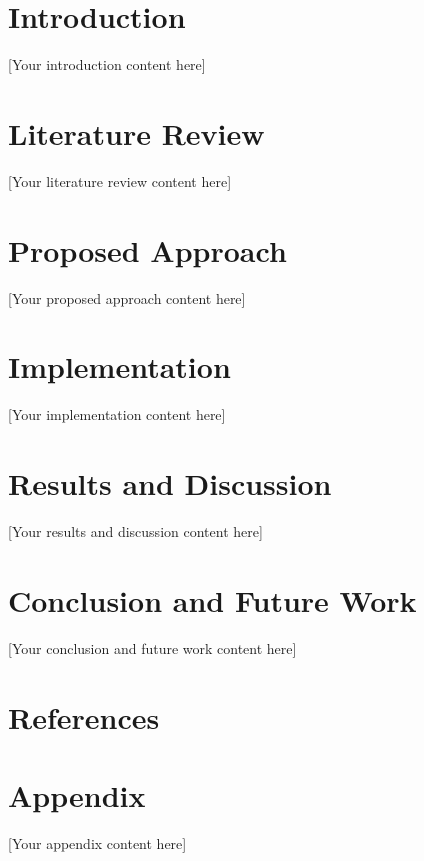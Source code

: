 \documentclass[12pt,a4paper]{report}
\begin{document}
\tableofcontents
\listoffigures
\clearpage

\chapter{Introduction}
[Your introduction content here]

\chapter{Literature Review}
[Your literature review content here]

\chapter{Proposed Approach}
[Your proposed approach content here]

\chapter{Implementation}
[Your implementation content here]

\chapter{Results and Discussion}
[Your results and discussion content here]

\chapter{Conclusion and Future Work}
[Your conclusion and future work content here]

\chapter*{References}

\appendix
\chapter*{Appendix}
[Your appendix content here]
\end{document}
